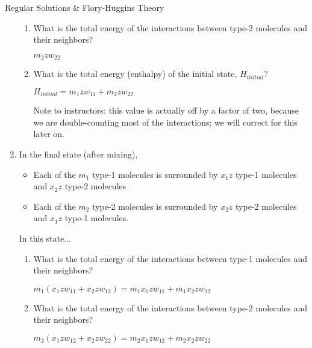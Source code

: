 \begin{activity}{Regular Solutions \& Flory-Huggins Theory}
\begin{exercises}
\begin{enumerate}
\begin{enumerate}
					\item What is the total energy of the interactions between type-2 molecules and their neighbors?
					
						\begin{solution}{}
							 $m_2 z w_{22}$
						\end{solution}
				
					\item What is the total energy (enthalpy) of the initial state, $H_{initial}$?
		
					\begin{solution}{}
						$H_{initial} = m_1 z w_{11} + m_2 z w_{22}$
			
						Note to instructors: this value is actually off by a factor of two, because we are double-counting most of the interactions; we will correct for this later on. 
					\end{solution}	
			
				\end{enumerate}

	\item In the final state (after mixing),
	
		\begin{itemize}[topsep=3pt,itemsep=0pt]
			\item Each of the $m_1$ type-1 molecules is surrounded by $x_1 z$ type-1 molecules and $x_2 z$ type-2 molecules
			\item Each of the $m_2$ type-2 molecules is surrounded by $x_2 z$ type-2 molecules and $x_1 z$ type-1 molecules.
		\end{itemize}
		In this state...
		
		\begin{enumerate}
			\item What is the total energy of the interactions between type-1 molecules and their neighbors?
			
				\begin{solution}{}
					$m_1(x_1 z w_{11} + x_2 z w_{12}) = m_1 x_1 z w_{11} + m_1 x_2 z w_{12}$
				\end{solution}
				
			\item What is the total energy of the interactions between type-2 molecules and their neighbors?
			
				\begin{solution}{}
					$m_2(x_1 z w_{12} + x_2 z w_{22}) = m_2 x_1 z w_{12} + m_2 x_2 z w_{22}$
				\end{solution}
				

\end{enumerate}
\end{enumerate}
\end{exercises}
\end{activity}
